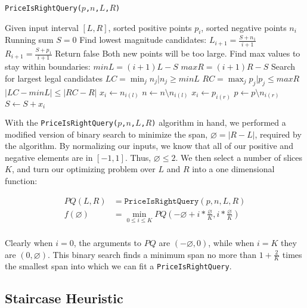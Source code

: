 \begin{algorithm}
\caption{ \texttt{PriceIsRightQuery($p$,$n$,$L$,$R$)} }
\label{alg:priceIsRight}
\begin{algorithmic}
\State Given input interval $[L,R]$, sorted positive points $p_i$, sorted negative points $n_i$
\State Running sum $S = 0$
\State Find lowest magnitude candidates:
\State $L_{i+1} = \frac{S + n_1}{i+1}$
\State $R_{i+1} = \frac{S + p_1}{i+1}$
\State Return false 
\State Both new points will be too large.
\EndIf
\State Find max values to stay within boundaries:  
\State $minL = (i+1)L - S$
\State $maxR = (i+1)R - S$
\State Search for largest legal candidates
\State $LC = \min_j n_j | n_j \geq minL$
\State $RC = \max_j p_j | p_j \leq maxR$
\If $|LC - minL | \leq |RC - R|$
\State $x_i \leftarrow n_{i(l)}$
\State $n   \leftarrow n \setminus n_{i(l)}$ 
\Else
\State $x_i \leftarrow p_{i(r)}$
\State $p   \leftarrow p \setminus n_{i(r)}$ 
\EndIf
\State $S \leftarrow S + x_i$
\EndFor
\end{algorithmic}
\end{algorithm}

With the \texttt{PriceIsRightQuery($p$,$n$,$L$,$R$)} algorithm in hand, we performed a modified version of binary search to minimize the span, $\diameter = |R-L|$, required by the algorithm.  By normalizing our inputs, we know that all of our positive and negative elements are in $[-1,1]$.  Thus, $\diameter \leq 2$.  We then select a number of slices $K$, and turn our optimizing problem over $L$ and $R$ into a one dimensional function:

\begin{align*}
PQ(L,R) &= \texttt{PriceIsRightQuery}(p,n,L,R) \\
f(\diameter) &= \min_{0 \leq i \leq K} PQ(-\diameter+i*\frac{\diameter}{K},i*\frac{\diameter}{K} ) \\
\end{align*}

Clearly when $i=0$, the arguments to $PQ$ are $(-\diameter,0)$, while when $i=K$ they are $(0,\diameter)$.  This binary search finds a minimum span no more than $1+\frac{2}{K}$ times the smallest span into which we can fit a \texttt{PriceIsRightQuery}.

\subsection{Staircase Heuristic} \label{subs:Staircase}

